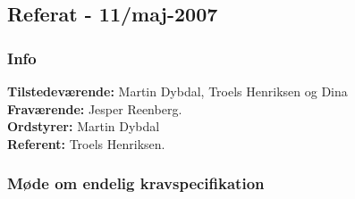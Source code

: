 \subsection{Referat - 11/maj-2007}

\subsubsection{Info}

\textbf{Tilstedeværende:} Martin Dybdal, Troels Henriksen og Dina\\
\textbf{Fraværende:} Jesper Reenberg.\\
\textbf{Ordstyrer:} Martin Dybdal\\
\textbf{Referent:} Troels Henriksen.

\subsubsection{Møde om endelig kravspecifikation}

